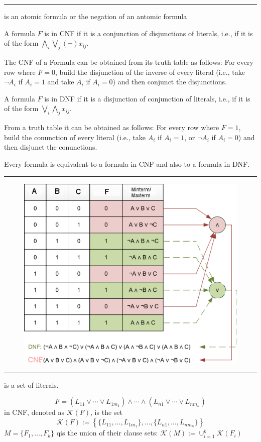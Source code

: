\documentclass[a4paper]{extarticle}
\newcommand{\cK}{\mathcal{K}}
\newcommand{\sep}{\vspace{5pt}\noindent\hrule\vspace{5pt}}
\begin{document}
\begin{multicols*}{2}
\sep

\Def[Literal] is an atomic formula or the negation of an antomic formula

 A formula $F$ is in CNF if it is a
conjunction of disjunctions of literals, i.e., if it is of the form
$\bigwedge_i \bigvee_j (\neg)x_{ij}$.

The CNF of a Formula can be obtained from its truth table as follows:
For every row where $F=0$, build the disjunction of the inverse of every literal
(i.e., take $\lnot A_i$ if $A_i=1$ and take $A_i$ if $A_i=0$) and then conjunct
the disjunctions.

 A formula $F$ is in DNF if it is a
disjunction of conjunction of literals, i.e., if it is of the form
$\bigvee_i\bigwedge_j x_{ij}$.

From a truth table it can be obtained as follows: For every row where $F=1$,
build the conunction of every literal (i.e., take $A_i$ if $A_i=1$, or $\lnot
A_i$ if $A_i=0$) and then disjunct the conunctions.

\Thm Every formula is equivalent to a formula in CNF and also to a formula in
DNF.

\sep

\begin{figure}[H]
 	\centering
  	\includegraphics[width=0.87\linewidth]{img/cnf-dnf.png}
\end{figure}

\sep

\Def[Clause] is a set of literals.

\[F=(L_{11}\lor\cdots\lor
L_{1m_1})\land\cdots\land(L_{n1}\lor \cdots\lor L_{nm_n})
\]
in CNF, denoted as $\cK(F)$, is the set 
\[
\cK(F):=\left\{\{L_{11},\ldots,L_{1m_1}\},\ldots,
\{L_{n1},\ldots ,L_{nm_n}\}\right\}
\]
 $M=\{F_1,\ldots,F_k\}$
qis the union of their clause sets: $\cK(M):=\cup_{i=1}^k \cK(F_i)$


\end{multicols*}
\end{document}
